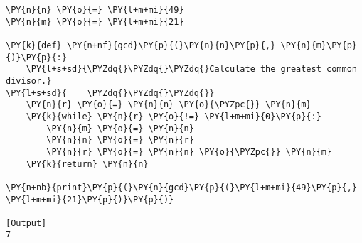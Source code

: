 \begin{Verbatim}[label=\makebox{\href{https://github.com/unipi-physics-labs/statnotes/tree/main/snippy/euclid_algorithm_func.py}{https://github.com/.../euclid\_algorithm\_func.py}},commandchars=\\\{\}]
\PY{n}{n} \PY{o}{=} \PY{l+m+mi}{49}
\PY{n}{m} \PY{o}{=} \PY{l+m+mi}{21}

\PY{k}{def} \PY{n+nf}{gcd}\PY{p}{(}\PY{n}{n}\PY{p}{,} \PY{n}{m}\PY{p}{)}\PY{p}{:}
    \PY{l+s+sd}{\PYZdq{}\PYZdq{}\PYZdq{}Calculate the greatest common divisor.}
\PY{l+s+sd}{    \PYZdq{}\PYZdq{}\PYZdq{}}
    \PY{n}{r} \PY{o}{=} \PY{n}{n} \PY{o}{\PYZpc{}} \PY{n}{m}
    \PY{k}{while} \PY{n}{r} \PY{o}{!=} \PY{l+m+mi}{0}\PY{p}{:}
        \PY{n}{m} \PY{o}{=} \PY{n}{n}
        \PY{n}{n} \PY{o}{=} \PY{n}{r}
        \PY{n}{r} \PY{o}{=} \PY{n}{n} \PY{o}{\PYZpc{}} \PY{n}{m}
    \PY{k}{return} \PY{n}{n}

\PY{n+nb}{print}\PY{p}{(}\PY{n}{gcd}\PY{p}{(}\PY{l+m+mi}{49}\PY{p}{,} \PY{l+m+mi}{21}\PY{p}{)}\PY{p}{)}

[Output]
7
\end{Verbatim}
